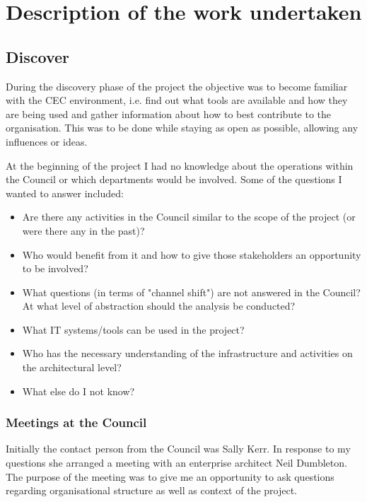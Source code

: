 
\chapter{Description of the work undertaken}
	\section{Discover}
	
During the discovery phase of the project the objective was to become familiar with the CEC environment, i.e. find out what tools are available and how they are being used and gather information about how to best contribute to the organisation. This was to be done while staying as open as possible, allowing any influences or ideas.

At the beginning of the project I had no knowledge about the operations within the Council or which departments would be involved. Some of the questions I wanted to answer included:
\begin{itemize}
\item Are there any activities in the Council similar to the scope of the project (or were there any in the past)?
\item Who would benefit from it and how to give those stakeholders an opportunity to be involved?
\item What questions (in terms of "channel shift") are not answered in the Council?
At what level of abstraction should the analysis be conducted?
\item What IT systems/tools can be used in the project?
\item Who has the necessary understanding of the infrastructure and activities on the architectural level?
\item What else do I not know?
\end{itemize}

		\subsection{Meetings at the Council}
		
Initially the contact person from the Council was Sally Kerr. In response to my questions she arranged a meeting with an enterprise architect Neil Dumbleton. The purpose of the meeting was to give me an opportunity to ask questions regarding organisational structure as well as context of the project.

